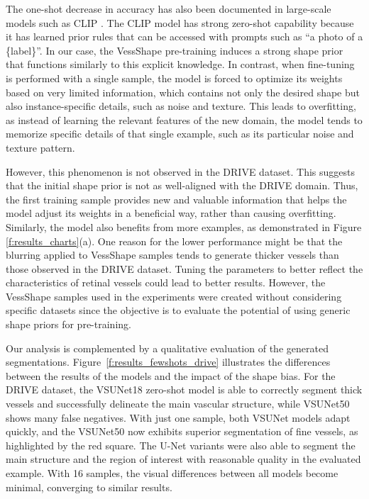 \documentclass[%
reprint,
nofootinbib,
 amsmath,amssymb,
aps,
superscriptaddress,
showkeys,
longbibliography
]{revtex4-1}
\begin{document}
The one-shot decrease in accuracy has also been documented in large-scale models such as CLIP \cite{Radford2021LearningTV}. The CLIP model has strong zero-shot capability because it has learned prior rules that can be accessed with prompts such as ``a photo of a \{label\}''. In our case, the VessShape pre-training induces a strong shape prior that functions similarly to this explicit knowledge. In contrast, when fine-tuning is performed with a single sample, the model is forced to optimize its weights based on very limited information, which contains not only the desired shape but also instance-specific details, such as noise and texture. This leads to overfitting, as instead of learning the relevant features of the new domain, the model tends to memorize specific details of that single example, such as its particular noise and texture pattern.

However, this phenomenon is not observed in the DRIVE dataset. This suggests that the initial shape prior is not as well-aligned with the DRIVE domain. Thus, the first training sample provides new and valuable information that helps the model adjust its weights in a beneficial way, rather than causing overfitting. Similarly, the model also benefits from more examples, as demonstrated in Figure \ref{f:results_charts}(a). One reason for the lower performance might be that the blurring applied to VessShape samples tends to generate thicker vessels than those observed in the DRIVE dataset. Tuning the parameters to better reflect the characteristics of retinal vessels could lead to better results. However, the VessShape samples used in the experiments were created without considering specific datasets since the objective is to evaluate the potential of using generic shape priors for pre-training.

Our analysis is complemented by a qualitative evaluation of the generated segmentations. Figure~\ref{f:results_fewshots_drive} illustrates the differences between the results of the models and the impact of the shape bias. For the DRIVE dataset, the VSUNet18 zero-shot model is able to correctly segment thick vessels and successfully delineate the main vascular structure, while VSUNet50 shows many false negatives. With just one sample, both VSUNet models adapt quickly, and the VSUNet50 now exhibits superior segmentation of fine vessels, as highlighted by the red square. The U-Net variants were also able to segment the main structure and the region of interest with reasonable quality in the evaluated example. With 16 samples, the visual differences between all models become minimal, converging to similar results.
\end{document}
